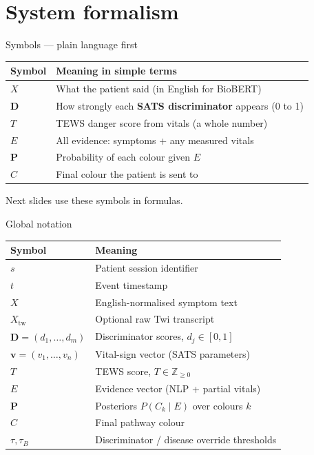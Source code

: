 \documentclass[aspectratio=169,11pt]{beamer}
\begin{document}
\section{System formalism}

\begin{frame}{Symbols --- plain language first}
	\small
	\begin{tabular}{@{}p{}p{}@{}}
		\toprule
		\textbf{Symbol} & \textbf{Meaning in simple terms} \\
		\midrule
		$X$ & What the patient said (in English for BioBERT) \\
		$\mathbf{D}$ & How strongly each \textbf{SATS discriminator} appears (0 to 1) \\
		$T$ & TEWS danger score from vitals (a whole number) \\
		$E$ & All evidence: symptoms + any measured vitals \\
		$\mathbf{P}$ & Probability of each colour given $E$ \\
		$C$ & Final colour the patient is sent to \\
		\bottomrule
	\end{tabular}

	\vspace{0.3em}
	Next slides use these symbols in formulas.
\end{frame}

\begin{frame}{Global notation}
	\small
	\begin{tabular}{@{}ll@{}}
		\toprule
		\textbf{Symbol} & \textbf{Meaning} \\
		\midrule
		$s$ & Patient session identifier \\
		$t$ & Event timestamp \\
		$X$ & English-normalised symptom text \\
		$X_{\text{tw}}$ & Optional raw Twi transcript \\
		$\mathbf{D}=(d_1,\ldots,d_m)$ & Discriminator scores, $d_j\in[0,1]$ \\
		$\mathbf{v}=(v_1,\ldots,v_n)$ & Vital-sign vector (SATS parameters) \\
		$T$ & TEWS score, $T\in\mathbb{Z}_{\geq 0}$ \\
		$E$ & Evidence vector (NLP + partial vitals) \\
		$\mathbf{P}$ & Posteriors $P(C_k\mid E)$ over colours $k$ \\
		$C$ & Final pathway colour \\
		$\tau,\tau_B$ & Discriminator / disease override thresholds \\
		\bottomrule
	\end{tabular}
\end{frame}
\end{document}
